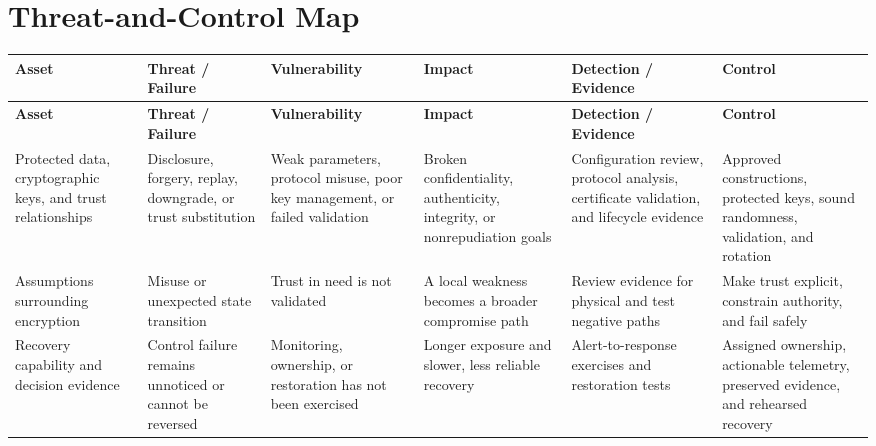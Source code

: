 \documentclass[11pt,letterpaper]{article}
\begin{document}
\section*{Threat-and-Control Map}
\begingroup\scriptsize\setlength{\tabcolsep}{2pt}
\begin{longtable}{>{\raggedright\arraybackslash}p{}>{\raggedright\arraybackslash}p{}>{\raggedright\arraybackslash}p{}>{\raggedright\arraybackslash}p{}>{\raggedright\arraybackslash}p{}>{\raggedright\arraybackslash}p{}}
\toprule\rowcolor{Navy}\color{white}\textbf{Asset} & \color{white}\textbf{Threat / Failure} & \color{white}\textbf{Vulnerability} & \color{white}\textbf{Impact} & \color{white}\textbf{Detection / Evidence} & \color{white}\textbf{Control}\\\midrule
\endfirsthead
\toprule\rowcolor{Navy}\color{white}\textbf{Asset} & \color{white}\textbf{Threat / Failure} & \color{white}\textbf{Vulnerability} & \color{white}\textbf{Impact} & \color{white}\textbf{Detection / Evidence} & \color{white}\textbf{Control}\\\midrule
\endhead
Protected data, cryptographic keys, and trust relationships & Disclosure, forgery, replay, downgrade, or trust substitution & Weak parameters, protocol misuse, poor key management, or failed validation & Broken confidentiality, authenticity, integrity, or nonrepudiation goals & Configuration review, protocol analysis, certificate validation, and lifecycle evidence & Approved constructions, protected keys, sound randomness, validation, and rotation\\\midrule
Assumptions surrounding encryption & Misuse or unexpected state transition & Trust in need is not validated & A local weakness becomes a broader compromise path & Review evidence for physical and test negative paths & Make trust explicit, constrain authority, and fail safely\\\midrule
Recovery capability and decision evidence & Control failure remains unnoticed or cannot be reversed & Monitoring, ownership, or restoration has not been exercised & Longer exposure and slower, less reliable recovery & Alert-to-response exercises and restoration tests & Assigned ownership, actionable telemetry, preserved evidence, and rehearsed recovery\\\midrule
\bottomrule
\end{longtable}
\endgroup
\end{document}
